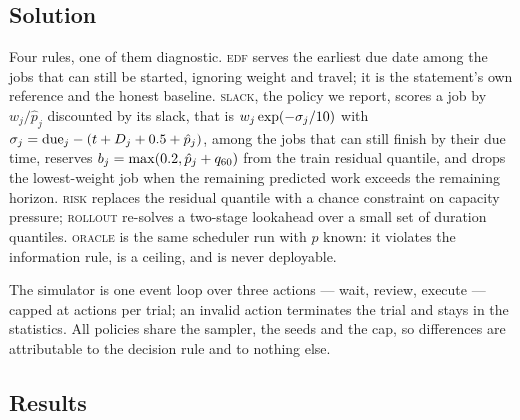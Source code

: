 \documentclass{swmcmthesis}
\begin{document}
\subsection{Solution}
\label{sec:p3sol}

Four rules, one of them diagnostic. \textsc{edf} serves the earliest due date among
the jobs that can still be started, ignoring weight and travel; it is the
statement's own reference and the honest baseline. \textsc{slack}, the policy we
report, scores a job by $w_j/\hat p_j$ discounted by its slack, that is
$w_j\exp(-\sigma_j/10)$ with
$\sigma_j=\text{due}_j-(t+D_j+0.5+\hat p_j)$, among the jobs that can
still finish by their due time, reserves
$b_j=\max(0.2,\hat p_j+q_{60})$ from the train residual quantile,
and drops the lowest-weight job when the remaining predicted work exceeds the
remaining horizon. \textsc{risk} replaces the residual quantile with a chance
constraint on capacity pressure; \textsc{rollout} re-solves a two-stage lookahead
over a small set of duration quantiles. \textsc{oracle} is the same scheduler run
with $p$ known: it violates the information rule, is a ceiling, and is never
deployable.

The simulator is one event loop over three actions --- wait, review, execute ---
capped at \slotMaxActions{} actions per trial; an invalid action terminates the trial
and stays in the statistics. All policies share the sampler, the seeds and the cap,
so differences are attributable to the decision rule and to nothing else.

\subsection{Results}
\label{sec:p3res}
\end{document}
